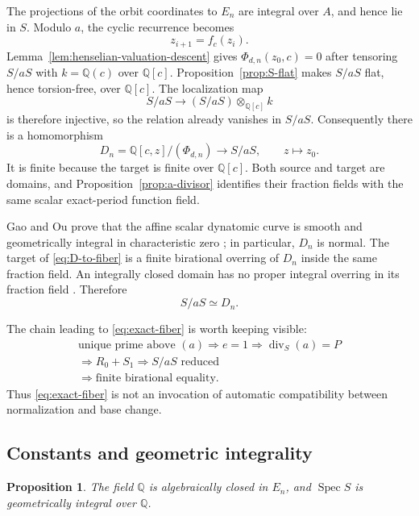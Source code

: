 \documentclass[11pt]{article}
\newtheorem{proposition}[theorem]{Proposition}
\theoremstyle{definition}
\theoremstyle{remark}
\newcommand{\Q}{\mathbb{Q}}
\newcommand{\Spec}{\operatorname{Spec}}
\newcommand{\divisor}{\operatorname{div}}
\begin{document}
The projections of the orbit coordinates to $E_n$ are integral over $A$,
and hence lie in $S$.  Modulo $a$, the cyclic recurrence becomes
\[
 z_{i+1}=f_c(z_i).
\]
Lemma~\ref{lem:henselian-valuation-descent} gives
$\Phi_{d,n}(z_0,c)=0$ after tensoring $S/aS$ with
$k=\Q(c)$ over $\Q[c]$.  Proposition~\ref{prop:S-flat} makes $S/aS$ flat,
hence torsion-free, over $\Q[c]$.  The localization map
\[
 S/aS\longrightarrow (S/aS)\otimes_{\Q[c]}k
\]
is therefore injective, so the relation already vanishes in $S/aS$.
Consequently there is a homomorphism
\begin{equation}\label{eq:D-to-fiber}
 D_n=\Q[c,z]/(\Phi_{d,n})\longrightarrow S/aS,
 \qquad z\longmapsto z_0.
\end{equation}
It is finite because the target is finite over $\Q[c]$.  Both source and
target are domains, and Proposition~\ref{prop:a-divisor} identifies their
fraction fields with the same scalar exact-period function field.

Gao and Ou prove that the affine scalar dynatomic curve is smooth and
geometrically integral in characteristic zero
\citep{gao-ou-2014-dynatomic}; in particular, $D_n$ is normal.  The target of
\eqref{eq:D-to-fiber} is a finite birational overring of $D_n$ inside the
same fraction field.  An integrally closed domain has no proper integral
overring in its fraction field \citep{stacks-0309}.  Therefore
\begin{equation}\label{eq:exact-fiber}
 \boxed{S/aS\simeq D_n.}
\end{equation}

The chain leading to \eqref{eq:exact-fiber} is worth keeping visible:
\[
 \begin{gathered}
  \text{unique prime above }(a)\Longrightarrow e=1
    \Longrightarrow \divisor_S(a)=P\\
  \Longrightarrow R_0+S_1
    \Longrightarrow S/aS\text{ reduced}\\
  \Longrightarrow \text{finite birational equality}.
 \end{gathered}
\]
Thus \eqref{eq:exact-fiber} is not an invocation of automatic compatibility
between normalization and base change.

\subsection{Constants and geometric integrality}

\begin{proposition}\label{prop:geometric-integrality}
The field $\Q$ is algebraically closed in $E_n$, and $\Spec S$ is
geometrically integral over $\Q$.
\end{proposition}
\end{document}
